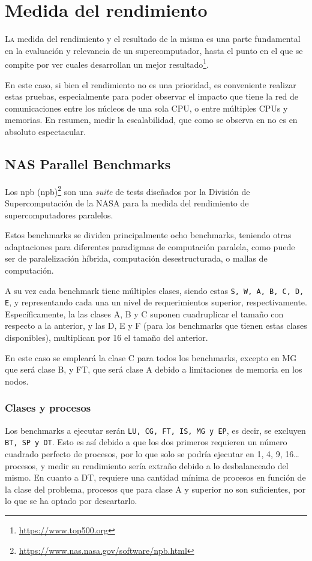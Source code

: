 \chapter{Medida del rendimiento}
\label{chap:medida_rendimiento}

\lettrine{L}{a} medida del rendimiento y el resultado de la misma es una parte fundamental en la evaluación y relevancia de un supercomputador, hasta el punto en el que se compite por ver cuales desarrollan un mejor resultado\footnote{\url{https://www.top500.org}}.

En este caso, si bien el rendimiento no es una prioridad, es conveniente realizar estas pruebas, especialmente para poder observar el impacto que tiene la red de comunicaciones entre los núcleos de una sola CPU, o entre múltiples CPUs y memorias. En resumen, medir la escalabilidad, que como se observa en  no es en absoluto espectacular.

\section{NAS Parallel Benchmarks}
Los \acrlong{npb} (\acrshort{npb})\footnote{\url{https://www.nas.nasa.gov/software/npb.html}} son una \textit{suite} de tests diseñados por la División de Supercomputación de la NASA para la medida del rendimiento de supercomputadores paralelos.

Estos benchmarks se dividen principalmente ocho benchmarks, teniendo otras adaptaciones para diferentes paradigmas de computación paralela, como puede ser de paralelización híbrida, computación desestructurada, o mallas de computación.

A su vez cada benchmark tiene múltiples clases, siendo estas \texttt{S, W, A, B, C, D, E}, y representando cada una un nivel de requerimientos superior, respectivamente. Específicamente, la las clases A, B y C suponen cuadruplicar el tamaño con respecto a la anterior, y las D, E y F (para los benchmarks que tienen estas clases disponibles), multiplican por 16 el tamaño del anterior.

En este caso se empleará la clase C para todos los benchmarks, excepto en MG que será clase B, y FT, que será clase A debido a limitaciones de memoria en los nodos.

\subsection{Clases y procesos}
\label{ssec:clases_y_procesos}
Los benchmarks a ejecutar serán \texttt{LU, CG, FT, IS, MG y EP}, es decir, se excluyen \texttt{BT, SP y DT}. Esto es así debido a que los dos primeros requieren un número cuadrado perfecto de procesos, por lo que solo se podría ejecutar en 1, 4, 9, 16\dots procesos, y medir su rendimiento sería extraño debido a lo desbalanceado del mismo. En cuanto a DT, requiere una cantidad mínima de procesos en función de la clase del problema, procesos que para clase A y superior no son suficientes, por lo que se ha optado por descartarlo.

